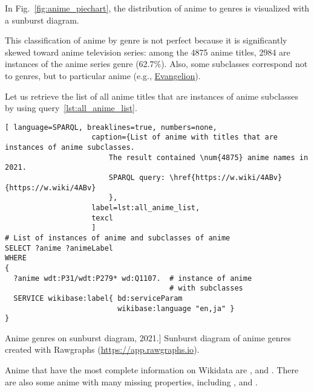 In Fig.~\ref{fig:anime_piechart}, the distribution of anime to genres is visualized with a sunburst diagram.

This classification of anime by genre is not perfect because it is significantly skewed toward anime television series: among the \num{4875} anime titles, \num{2984} are instances of the anime series genre (\num{62.7}\%). Also, some subclasses correspond not to genres, but to particular anime (e.g., \href{https://w.wiki/3iKe}{Evangelion}).

Let us retrieve the list of all anime titles that are instances of anime subclasses by using query~\ref{lst:all_anime_list}.

\begin{lstlisting}[ language=SPARQL, breaklines=true, numbers=none,
                    caption={List of anime with titles that are instances of anime subclasses.
                        The result contained \num{4875} anime names in 2021.
                        SPARQL query: \href{https://w.wiki/4ABv}{https://w.wiki/4ABv}
                        },
                    label=lst:all_anime_list,
                    texcl 
                    ]
# List of instances of anime and subclasses of anime
SELECT ?anime ?animeLabel
WHERE
{
  ?anime wdt:P31/wdt:P279* wd:Q1107.  # instance of anime
                                      # with subclasses
  SERVICE wikibase:label{ bd:serviceParam 
                          wikibase:language "en,ja" }
}
\end{lstlisting}%

\begin{marginfigure}[0.0cm]
{
	\setlength{\fboxsep}{0pt}%
	\setlength{\fboxrule}{1pt}%
}
\caption
[Anime genres on sunburst diagram, 2021.]
{
Sunburst diagram of anime genres created with Rawgraphs (\href{https://app.rawgraphs.io}{https://app.rawgraphs.io}).\newline
}
\label{fig:anime_piechart}
\end{marginfigure}

Anime that have the most complete information on Wikidata are ,  and . There are also some anime with many missing properties, including ,  and .


